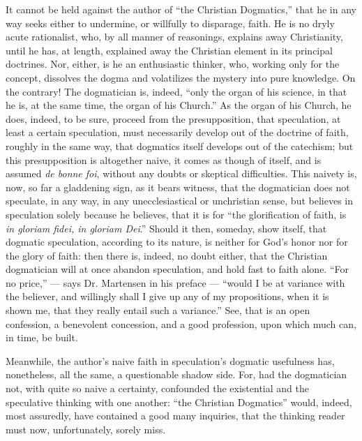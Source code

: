 \documentclass[12pt]{book}
\begin{document}
It cannot be held against the author of ``the Christian Dogmatics,'' that he in any way seeks either to undermine, or willfully to disparage, faith. He is no dryly acute rationalist, who, by all manner of reasonings, explains away Christianity, until he has, at length, explained away the Christian element in its principal doctrines. Nor, either, is he an enthusiastic thinker, who, working only for the concept, dissolves the dogma and volatilizes the mystery into pure knowledge. On the contrary! The dogmatician is, indeed, ``only the organ of his science, in that he is, at the same time, the organ of his Church.'' As the organ of his Church, he does, indeed, to be sure, proceed from the presupposition, that speculation, at least a certain speculation, must necessarily develop out of the doctrine of faith, roughly in
the same way, that dogmatics itself develops out of the catechism; but this presupposition is altogether naive, it comes as though of itself, and is assumed \textit{de bonne foi}, without any doubts or skeptical difficulties. This naivety is, now, so far a gladdening sign, as it bears witness, that the dogmatician does not speculate, in any way, in any unecclesiastical or unchristian sense, but believes in speculation solely because he believes, that it is for ``the glorification of faith, is \textit{in gloriam fidei, in gloriam Dei}.'' Should it then, someday, show itself, that dogmatic speculation, according to its nature, is neither for God's honor nor for the glory of faith: then there is, indeed, no doubt either, that the Christian dogmatician will at once abandon speculation, and hold fast to faith alone. ``For no price,'' --- says Dr. Martensen in his preface --- ``would I be at variance with the believer, and willingly shall I give up any of my propositions, when it is shown me, that they really entail such a variance.'' See, that is an open confession, a benevolent concession, and a good profession, upon which much can, in time, be built.

Meanwhile, the author's naive faith in speculation's dogmatic usefulness has, nonetheless, all the same, a questionable shadow side. For, had the dogmatician not, with quite so naive a certainty, confounded the existential and the speculative thinking with one another: ``the Christian Dogmatics'' would, indeed, most assuredly, have contained a good many inquiries, that the thinking reader must now, unfortunately, sorely miss.
\end{document}
